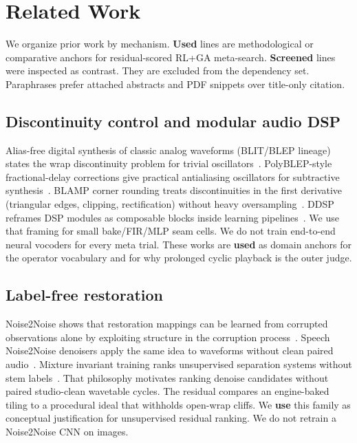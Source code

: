 \section{Related Work}
\label{sec:related_work}

We organize prior work by mechanism.
\textbf{Used} lines are methodological or comparative anchors for residual-scored RL+GA meta-search.
\textbf{Screened} lines were inspected as contrast. They are excluded from the dependency set.
Paraphrases prefer attached abstracts and PDF snippets over title-only citation.

\subsection{Discontinuity control and modular audio DSP}
Alias-free digital synthesis of classic analog waveforms (BLIT/BLEP lineage) states the wrap discontinuity problem for trivial oscillators~\cite{stilson1996}.
PolyBLEP-style fractional-delay corrections give practical antialiasing oscillators for subtractive synthesis~\cite{nam2009polyblep}.
BLAMP corner rounding treats discontinuities in the first derivative (triangular edges, clipping, rectification) without heavy oversampling~\cite{esqueda2016blamp}.
DDSP reframes DSP modules as composable blocks inside learning pipelines~\cite{engel2020}.
We use that framing for small bake/FIR/MLP seam cells.
We do not train end-to-end neural vocoders for every meta trial.
These works are \textbf{used} as domain anchors for the operator vocabulary and for why prolonged cyclic playback is the outer judge.

\subsection{Label-free restoration}
Noise2Noise shows that restoration mappings can be learned from corrupted observations alone by exploiting structure in the corruption process~\cite{lehtinen2018}.
Speech Noise2Noise denoisers apply the same idea to waveforms without clean paired audio~\cite{kashyap2021n2n}.
Mixture invariant training ranks unsupervised separation systems without stem labels~\cite{wisdom2020}.
That philosophy motivates ranking denoise candidates without paired studio-clean wavetable cycles.
The residual compares an engine-baked tiling to a procedural ideal that withholds open-wrap cliffs.
We \textbf{use} this family as conceptual justification for unsupervised residual ranking.
We do not retrain a Noise2Noise CNN on images.

